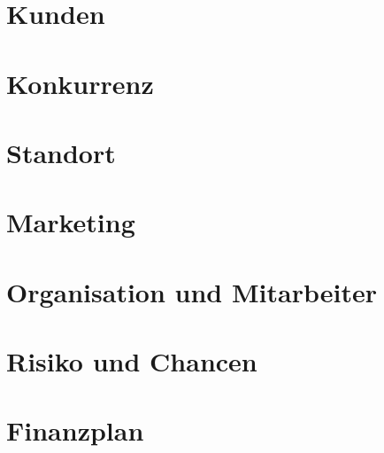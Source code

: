 





\tableofcontents
\newpage





\section{Kunden}

\section{Konkurrenz}



\section{Standort}

\section{Marketing}

\section{Organisation und Mitarbeiter}

\section{Risiko und Chancen}

\section{Finanzplan}









\newpage
\printbibliography






